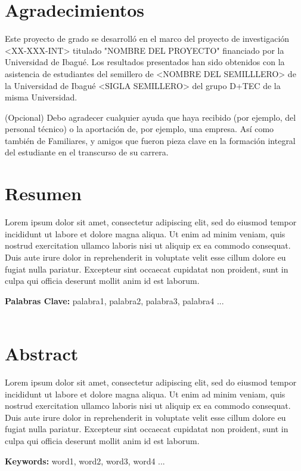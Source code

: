 \documentclass[a4paper,oneside,12pt]{book}
\title{\thesistitle}
\author{\authorname}
\begin{document}



\section*{\Huge{Agradecimientos}}
Este proyecto de grado se desarrolló en el marco del proyecto de investigación <XX-XXX-INT> titulado "NOMBRE DEL PROYECTO" financiado por la Universidad de Ibagué. Los resultados presentados han sido obtenidos con la asistencia de estudiantes del semillero de <NOMBRE DEL SEMILLLERO> de la Universidad de Ibagué <SIGLA SEMILLERO> del grupo D+TEC de la misma Universidad. 

(Opcional)
Debo agradecer cualquier ayuda que haya recibido (por ejemplo, del personal técnico) o la aportación de, por ejemplo, una empresa. Así como también de Familiares, y amigos que fueron pieza clave en la formación integral del estudiante en el transcurso de su carrera.

\newpage
\section*{\Huge{Resumen}}
Lorem ipsum dolor sit amet, consectetur adipiscing elit, sed do eiusmod tempor incididunt ut labore et dolore magna aliqua. Ut enim ad minim veniam, quis nostrud exercitation ullamco laboris nisi ut aliquip ex ea commodo consequat. Duis aute irure dolor in reprehenderit in voluptate velit esse cillum dolore eu fugiat nulla pariatur. Excepteur sint occaecat cupidatat non proident, sunt in culpa qui officia deserunt mollit anim id est laborum.

{\large{\textbf{Palabras Clave:}}} palabra1, palabra2, palabra3, palabra4 ...
\\ \\

\section*{\Huge{Abstract}}
Lorem ipsum dolor sit amet, consectetur adipiscing elit, sed do eiusmod tempor incididunt ut labore et dolore magna aliqua. Ut enim ad minim veniam, quis nostrud exercitation ullamco laboris nisi ut aliquip ex ea commodo consequat. Duis aute irure dolor in reprehenderit in voluptate velit esse cillum dolore eu fugiat nulla pariatur. Excepteur sint occaecat cupidatat non proident, sunt in culpa qui officia deserunt mollit anim id est laborum.

{\large{\textbf{Keywords:}}} word1, word2, word3, word4 ...
\end{document}

